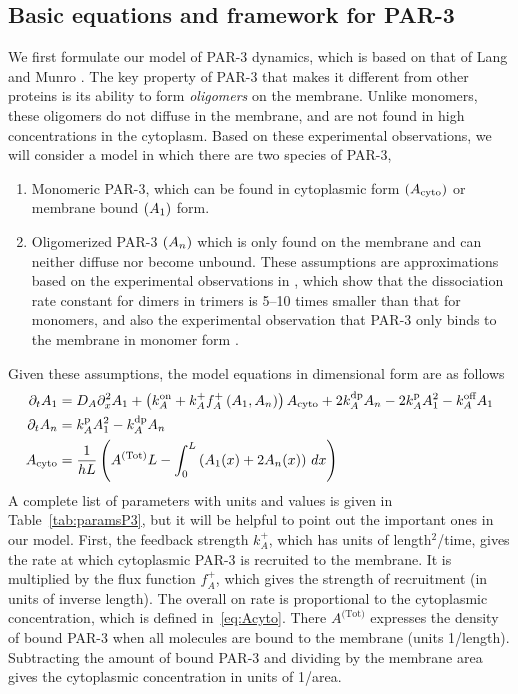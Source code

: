 \documentclass[11pt]{article}
\newcommand{\6}[1]{#1_{\text{6}}}
\newcommand{\3}[1]{#1_{\text{3}}}
\newcommand{\Tot}[1]{#1^\text{(Tot)}}
\newcommand{\A}[1]{#1_A}
\begin{document}
\subsection{Basic equations and framework for PAR-3 \label{sec:Par3}}
We first formulate our model of PAR-3 dynamics, which is based on that of Lang and Munro \cite{lang2022oligomerization}. The key property of PAR-3 that makes it different from other proteins is its ability to form \emph{oligomers} on the membrane. Unlike monomers, these oligomers do not diffuse in the membrane, and are not found in high concentrations in the cytoplasm. Based on these experimental observations, we will consider a model in which there are two species of PAR-3, 
\begin{enumerate}
\item Monomeric PAR-3, which can be found in cytoplasmic form $(A_\text{cyto})$ or membrane bound $(A_1)$ form.
\item Oligomerized PAR-3 $(A_n)$ which is only found on the membrane and can neither diffuse nor become unbound. These assumptions are approximations based on the experimental observations in \cite[Fig.~3K]{lang2023oligomerization}, which show that the dissociation rate constant for dimers in trimers is 5--10 times smaller than that for monomers, and also the experimental observation that PAR-3 only binds to the membrane in monomer form \cite{lang2023oligomerization}.
\end{enumerate}
Given these assumptions, the model equations in dimensional form are as follows
\begin{subequations}
\label{eq:P3model}
\begin{align}
\Dt \MA & = \A{D} \Dx^2 \MA + \left(\A{\kon}+\A{\kf}\A{f}^+\left(\MA,\PA\right)\right)  \MAC + 2\A{\kdp}\PA -2\A{\kp} \MA^2 - \A{\koff}\MA \\
\Dt \PA & =\A{\kp}\MA^2- \A{\kdp}\PA \\ \label{eq:Acyto}
A_\text{cyto} & = \frac{1}{h L} \left(\Tot{A} L - \int_0^L \left(A_1(x)+2A_n(x)\right) \, dx \right)
\end{align}
\end{subequations}
A complete list of parameters with units and values is given in Table\ \ref{tab:paramsP3}, but it will be helpful to point out the important ones in our model. First, the feedback strength $k_A^+$, which has units of length$^2$/time, gives the rate at which cytoplasmic PAR-3 is recruited to the membrane. It is multiplied by the flux function $f_A^+$, which gives the strength of recruitment (in units of inverse length). The overall on rate is proportional to the cytoplasmic concentration, which is defined in\ \eqref{eq:Acyto}. There $\Tot{A}$ expresses the density of bound PAR-3 when all molecules are bound to the membrane (units 1/length). Subtracting the amount of bound PAR-3 and dividing by the membrane area gives
the cytoplasmic concentration in units of 1/area.
\end{document}
